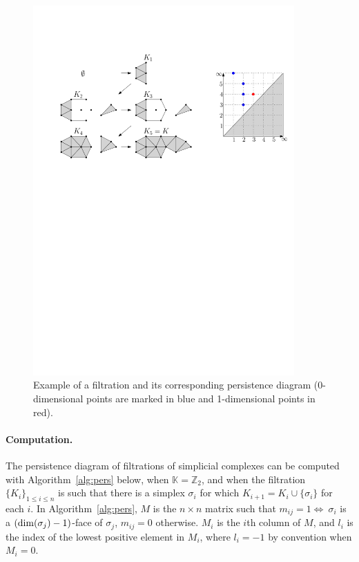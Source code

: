 \begin{figure}[h]\centering 
\includegraphics[width = 10cm]{figures/ExampleFiltration} \caption[Persistence diagram induced by filtration]{\label{fig:filtrex} Example of a filtration
and its corresponding persistence diagram (0-dimensional points are marked in blue and 1-dimensional points in red).} 
\end{figure} 



\paragraph*{Computation.}
The persistence diagram of filtrations of simplicial complexes can be computed with Algorithm~\ref{alg:pers} below, when $\mathbb{K}=\mathbb{Z}_{2}$, 
and when the filtration $\{K_{i}\}_{1\leq i\leq n}$ is such that there is a simplex $\sigma_i$ for which 
$K_{i+1}=K_{i}\cup\{\sigma_{i}\}$ for each $i$. In Algorithm~\ref{alg:pers}, $M$ is the $n\times n$ matrix such that 
$m_{ij}=1\Leftrightarrow\ \sigma_{i}$ is a $({\rm dim}(\sigma_j)-1)$-face of $\sigma_j$, $m_{ij}=0$ otherwise. 
$M_{i}$ is the $i$th column of $M$, and $l_{i}$ is the index of the lowest positive element in $M_{i}$, where $l_i=-1$
by convention when $M_i=0$.

